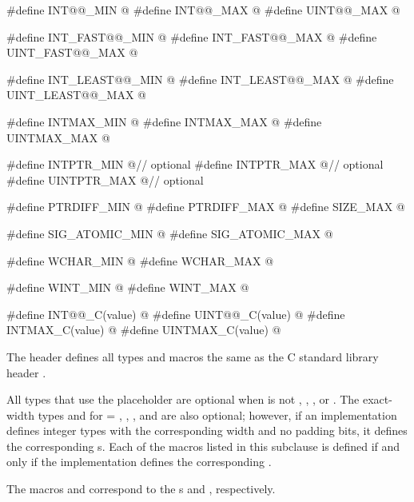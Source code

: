 \begin{codeblock}
#define INT@@_MIN         @\seebelow@
#define INT@@_MAX         @\seebelow@
#define UINT@@_MAX        @\seebelow@

#define INT_FAST@@_MIN    @\seebelow@
#define INT_FAST@@_MAX    @\seebelow@
#define UINT_FAST@@_MAX   @\seebelow@

#define INT_LEAST@@_MIN   @\seebelow@
#define INT_LEAST@@_MAX   @\seebelow@
#define UINT_LEAST@@_MAX  @\seebelow@

#define INTMAX_MIN       @\seebelow@
#define INTMAX_MAX       @\seebelow@
#define UINTMAX_MAX      @\seebelow@

#define INTPTR_MIN       @\seebelow@              // optional
#define INTPTR_MAX       @\seebelow@              // optional
#define UINTPTR_MAX      @\seebelow@              // optional

#define PTRDIFF_MIN      @\seebelow@
#define PTRDIFF_MAX      @\seebelow@
#define SIZE_MAX         @\seebelow@

#define SIG_ATOMIC_MIN   @\seebelow@
#define SIG_ATOMIC_MAX   @\seebelow@

#define WCHAR_MIN        @\seebelow@
#define WCHAR_MAX        @\seebelow@

#define WINT_MIN         @\seebelow@
#define WINT_MAX         @\seebelow@

#define INT@@_C(value)    @\seebelow@
#define UINT@@_C(value)   @\seebelow@
#define INTMAX_C(value)  @\seebelow@
#define UINTMAX_C(value) @\seebelow@
\end{codeblock}

\pnum
The header defines all types and macros the same as
the C standard library header .


\pnum
All types that use the placeholder 
are optional when 
is not , , , or .
The exact-width types
 and 
for  = , , , and 
are also optional;
however, if an implementation defines integer types
with the corresponding width and no padding bits,
it defines the corresponding s.
Each of the macros listed in this subclause
is defined if and only if
the implementation defines the corresponding .
\begin{note}
The macros  and 
correspond to the s
 and ,
respectively.
\end{note}

